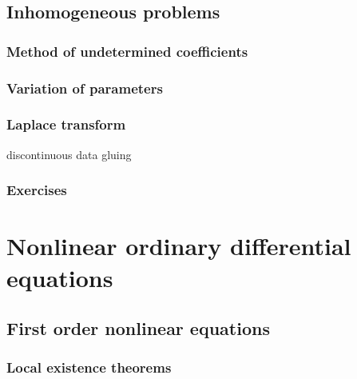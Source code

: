 \documentclass{../note}
\begin{document}
\chapter{Inhomogeneous problems}
\section{Method of undetermined coefficients}
\section{Variation of parameters}
\section{Laplace transform}

discontinuous data gluing


\section*{Exercises}

\begin{prb}
\end{prb}






\part{Nonlinear ordinary differential equations}
\chapter{First order nonlinear equations}
\section{Local existence theorems}
\end{document}

